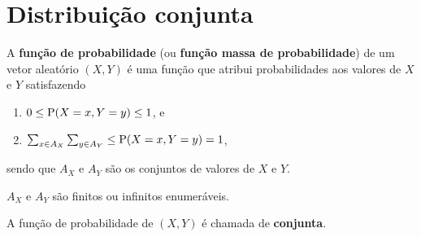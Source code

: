 \section{Distribuição conjunta}

\begin{definition}
    \label{def:ch03-fp-2d}
    A \textbf{função de probabilidade} (ou
    \textbf{função massa de probabilidade}) de um vetor aleatório
    $(X, Y)$ é uma função que atribui probabilidades aos 
    valores de $X$ e $Y$ satisfazendo
    \begin{enumerate}
        \item $0 \leq \operatorname{P}(X = x, Y = y) \leq 1$, e
        \item $\sum_{x \in A_X} \sum_{y \in A_Y}
        \leq \operatorname{P}(X = x, Y = y) = 1$,
    \end{enumerate}
    sendo que $A_X$ e $A_Y$ são os conjuntos de valores
    de $X$ e $Y$.
    \begin{obs}
        $A_X$ e $A_Y$ são finitos ou infinitos enumeráveis.
    \end{obs}

    A função de probabilidade de $(X, Y)$ é chamada de
    \textbf{conjunta}.
\end{definition}

